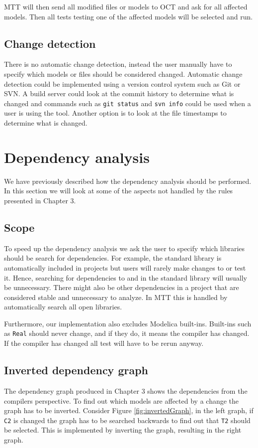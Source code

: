 \documentclass{cslthse-msc}
\begin{document}
MTT will then send all modified files or models to OCT and ask for all affected models. Then all tests testing one of the affected models will be selected and run.

\subsection{Change detection}
There is no automatic change detection, instead the user manually have to specify which models or files should be considered changed. Automatic change detection could be implemented using a version control system such as Git or SVN. A build server could look at the commit history to determine what is changed and commands such as \texttt{git status} and \texttt{svn info} could be used when a user is using the tool. Another option is to look at the file timestamps to determine what is changed.

\section{Dependency analysis}
We have previously described how the dependency analysis should be performed. In this section we will look at some of the aspects not handled by the rules presented in Chapter 3.

\subsection{Scope}
To speed up the dependency analysis we ask the user to specify which libraries should be search for dependencies. For example, the standard library is automatically included in projects but users will rarely make changes to or test it. Hence, searching for dependencies to and in the standard library will usually be unnecessary. There might also be other dependencies in a project that are considered stable and unnecessary to analyze. In MTT this is handled by automatically search all open libraries.

Furthermore, our implementation also excludes Modelica built-ins. Built-ins such as \texttt{Real} should never change, and if they do, it means the compiler has changed. If the compiler has changed all test will have to be rerun anyway.

\subsection{Inverted dependency graph}
The dependency graph produced in Chapter 3 shows the dependencies from the compilers perspective. To find out which models are affected by a change the graph has to be inverted. Consider Figure \ref{fig:invertedGraph}, in the left graph, if \texttt{C2} is changed the graph has to be searched backwards to find out that \texttt{T2} should be selected. This is implemented by inverting the graph, resulting in the right graph.
\end{document}
